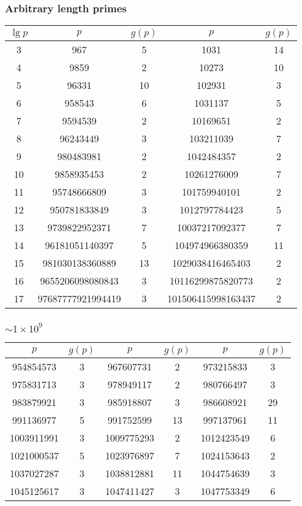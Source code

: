 \subsubsection{Arbitrary length primes}
  \begin{tabular}{|c|c|c|c|c|}
  \hline
  $\lg p$ & $p$ & $g(p)$ & $p$ & $g(p)$ \\ \hline
3 & 967 & 5 & 1031 & 14 \\
4 & 9859 & 2 & 10273 & 10 \\
5 & 96331 & 10 & 102931 & 3 \\
6 & 958543 & 6 & 1031137 & 5 \\
7 & 9594539 & 2 & 10169651 & 2 \\
8 & 96243449 & 3 & 103211039 & 7 \\
9 & 980483981 & 2 & 1042484357 & 2 \\
10 & 9858935453 & 2 & 10261276009 & 7 \\
11 & 95748666809 & 3 & 101759940101 & 2 \\
12 & 950781833849 & 3 & 1012797784423 & 5 \\
13 & 9739822952371 & 7 & 10037217092377 & 7 \\
14 & 96181051140397 & 5 & 104974966380359 & 11 \\
15 & 981030138360889 & 13 & 1029038416465403 & 2 \\
16 & 9655206098080843 & 3 & 10116299875820773 & 2 \\
17 & 97687777921994419 & 3 & 101506415998163437 & 2 \\
  \hline
  \end{tabular}

\subsubsection{$\sim 1 \times 10^9$}

  \begin{tabular}{|c|c|c|c|c|c|}
  \hline
  $p$ & $g(p)$ & $p$ & $g(p)$ & $p$ & $g(p)$ \\ \hline
954854573 & 3 & 967607731 & 2 & 973215833 & 3 \\
975831713 & 3 & 978949117 & 2 & 980766497 & 3 \\
983879921 & 3 & 985918807 & 3 & 986608921 & 29 \\
991136977 & 5 & 991752599 & 13 & 997137961 & 11 \\
1003911991 & 3 & 1009775293 & 2 & 1012423549 & 6 \\
1021000537 & 5 & 1023976897 & 7 & 1024153643 & 2 \\
1037027287 & 3 & 1038812881 & 11 & 1044754639 & 3 \\
1045125617 & 3 & 1047411427 & 3 & 1047753349 & 6 \\
  \hline
  \end{tabular}

